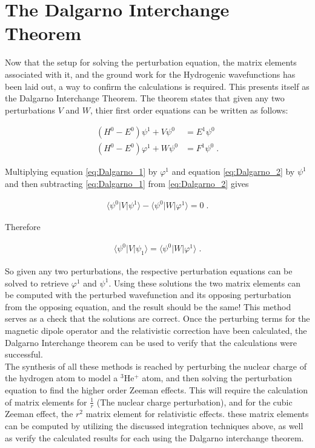     \section{The Dalgarno Interchange Theorem} \label{sec:Dalgarno_Interchange_Theorem}
        Now that the setup for solving the perturbation equation, the matrix elements associated with it, and the ground work for the Hydrogenic wavefunctions has been laid out, a way to confirm the calculations is required. This presents itself as the Dalgarno Interchange Theorem. The theorem states that given any two perturbations $V$ and $W$, thier first order equations can be written as follows:

        \begin{align}
            \left( H^0 - E^0 \right) \psi^1 + V \psi^0 &= E^1 \psi^0 \label{eq:Dalgarno_1}\\
            \left( H^0 - E^0 \right) \varphi^1 + W \psi^0 &= F^1 \psi^0 \label{eq:Dalgarno_2}\;.
        \end{align}

        Multiplying equation \eqref{eq:Dalgarno_1} by $\varphi^1$ and equation \eqref{eq:Dalgarno_2} by $\psi^1$ and then subtracting \eqref{eq:Dalgarno_1} from \eqref{eq:Dalgarno_2} gives

        \begin{align}
            \langle \psi^0 \vert V \vert \psi^1 \rangle - \langle \psi^0 \vert W \vert \varphi^1 \rangle = 0\;.
        \end{align}

        \noindent Therefore 

        \begin{align}
            \langle \psi^0 \vert V \vert \psi_1 \rangle = \langle \psi^0 \vert W \vert \varphi^1 \rangle\;.
        \end{align}

        So given any two perturbations, the respective perturbation equations can be solved to retrieve $\varphi^1$ and $\psi^1$. Using these solutions the two matrix elements can be computed with the perturbed wavefunction and its opposing perturbation from the opposing equation, and the result should be the same! This method serves as a check that the solutions are correct. Once the perturbing terms for the magnetic dipole operator and the relativistic correction have been calculated, the Dalgarno Interchange theorem can be used to verify that the calculations were successful.\\

        The synthesis of all these methods is reached by perturbing the nuclear charge of the hydrogen atom to model a $^3$He$^+$ atom, and then solving the perturbation equation to find the higher order Zeeman effects. This will require the calculation of matrix elements for $\frac{1}{r}$ (The nuclear charge perturbation), and for the cubic Zeeman effect, the $r^2$ matrix element for relativistic effects. these matrix elements can be computed by utilizing the discussed integration techniques above, as well as verify the calculated results for each using the Dalgarno interchange theorem.
    
    